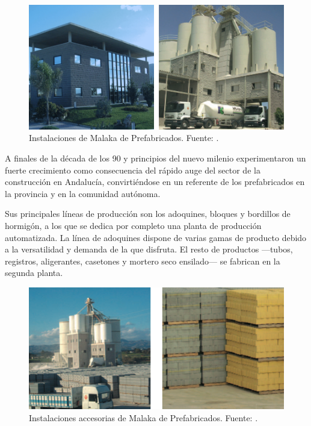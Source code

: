 \begin{figure}[!htb]
\centering
\includegraphics[width=15cm]{malaka1.png}
\caption[Instalaciones de Malaka de Prefabricados.]{Instalaciones de Malaka de Prefabricados. Fuente: \protect\cite{malakacatalogo}.}
\label{fig:malakainstalaciones1}
\end{figure}

A finales de la década de los 90 y principios del nuevo milenio experimentaron un fuerte crecimiento como consecuencia del rápido auge del sector de la construcción en Andalucía, convirtiéndose en un referente de los prefabricados en la provincia y en la comunidad autónoma.

Sus principales líneas de producción son los adoquines, bloques y bordillos de hormigón, a los que se dedica por completo una planta de producción automatizada. La línea de adoquines dispone de varias gamas de producto debido a la versatilidad y demanda de la que disfruta. El resto de productos —tubos, registros, aligerantes, casetones y mortero seco ensilado— se fabrican en la segunda planta.

\begin{figure}[!htb]
\centering
\includegraphics[width=15cm]{malaka2.png}
\caption[Instalaciones accesorias de Malaka de Prefabricados.]{Instalaciones accesorias de Malaka de Prefabricados. Fuente: \protect\cite{malakacatalogo}.}
\label{fig:malakainstalaciones2}
\end{figure}

